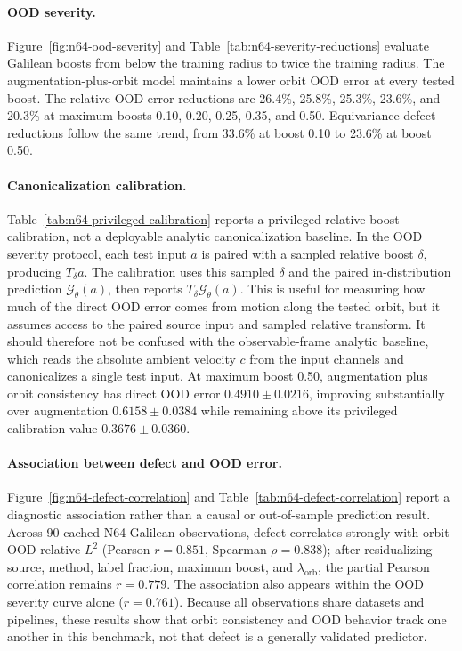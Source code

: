 \paragraph{OOD severity.} Figure~\ref{fig:n64-ood-severity} and Table~\ref{tab:n64-severity-reductions} evaluate Galilean boosts from below the training radius to twice the training radius. The augmentation-plus-orbit model maintains a lower orbit OOD error at every tested boost. The relative OOD-error reductions are 26.4\%, 25.8\%, 25.3\%, 23.6\%, and 20.3\% at maximum boosts 0.10, 0.20, 0.25, 0.35, and 0.50. Equivariance-defect reductions follow the same trend, from 33.6\% at boost 0.10 to 23.6\% at boost 0.50.

\paragraph{Canonicalization calibration.} Table~\ref{tab:n64-privileged-calibration} reports a privileged relative-boost calibration, not a deployable analytic canonicalization baseline. In the OOD severity protocol, each test input \(a\) is paired with a sampled relative boost \(\delta\), producing \(T_\delta a\). The calibration uses this sampled \(\delta\) and the paired in-distribution prediction \(\mathcal G_\theta(a)\), then reports \(T_\delta \mathcal G_\theta(a)\). This is useful for measuring how much of the direct OOD error comes from motion along the tested orbit, but it assumes access to the paired source input and sampled relative transform. It should therefore not be confused with the observable-frame analytic baseline, which reads the absolute ambient velocity \(c\) from the input channels and canonicalizes a single test input. At maximum boost 0.50, augmentation plus orbit consistency has direct OOD error \(0.4910\pm0.0216\), improving substantially over augmentation \(0.6158\pm0.0384\) while remaining above its privileged calibration value \(0.3676\pm0.0360\).

\paragraph{Association between defect and OOD error.} Figure~\ref{fig:n64-defect-correlation} and Table~\ref{tab:n64-defect-correlation} report a diagnostic association rather than a causal or out-of-sample prediction result. Across 90 cached N64 Galilean observations, defect correlates strongly with orbit OOD relative \(L^2\) (Pearson \(r=0.851\), Spearman \(\rho=0.838\)); after residualizing source, method, label fraction, maximum boost, and \(\lambda_{\mathrm{orb}}\), the partial Pearson correlation remains \(r=0.779\). The association also appears within the OOD severity curve alone (\(r=0.761\)). Because all observations share datasets and pipelines, these results show that orbit consistency and OOD behavior track one another in this benchmark, not that defect is a generally validated predictor.

